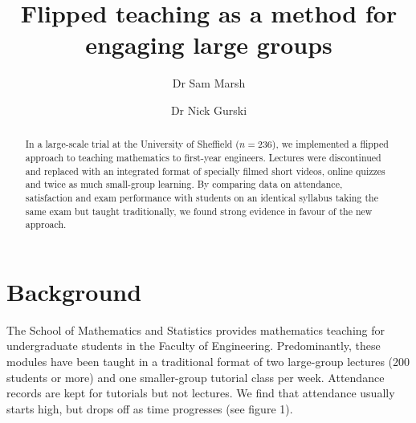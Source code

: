 \documentclass{amsart}
\title{Flipped teaching as a method for engaging large groups}
\author{Dr Sam Marsh}
\author{Dr Nick Gurski}
\begin{document}
\maketitle

\begin{abstract}
In a large-scale trial at the University of Sheffield ($n=236$), we implemented a flipped approach to teaching mathematics to first-year engineers. Lectures were discontinued and replaced with an integrated format of specially filmed short videos, online quizzes and twice as much small-group learning.  By comparing data on attendance, satisfaction and exam performance with students on an identical syllabus taking the same exam but taught traditionally, we found strong evidence in favour of the new approach.
\end{abstract}

\section{Background}
The School of Mathematics and Statistics provides mathematics teaching for undergraduate students in the Faculty of Engineering. Predominantly, these modules have been taught in a traditional format of two large-group lectures (200 students or more) and one smaller-group tutorial class per week.  Attendance records are kept for tutorials but not lectures.  We find that attendance usually starts high, but drops off as time progresses (see figure 1).
\end{document}
